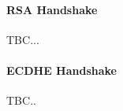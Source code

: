 \documentclass[../main.tex]{subfiles}
\begin{document}
\label{sec:ssloverview}
\paragraph{RSA Handshake}
TBC...

\paragraph{ECDHE Handshake}
TBC..
\end{document}
